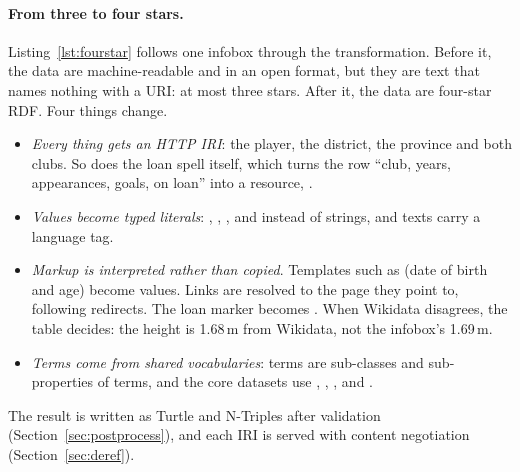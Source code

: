 \paragraph{From three to four stars.} Listing~\ref{lst:fourstar} follows one
infobox through the transformation. Before it, the data are machine-readable
and in an open format, but they are text that names nothing with a URI: at
most three stars. After it, the data are four-star RDF. Four things change.
\begin{itemize}
  \item \emph{Every thing gets an HTTP IRI}: the player, the district, the
        province and both clubs. So does the loan spell itself, which turns
        the row ``club, years, appearances, goals, on loan'' into a resource,
        .
  \item \emph{Values become typed literals}: ,
        , ,  and
         instead of strings, and texts carry a language tag.
  \item \emph{Markup is interpreted rather than copied}. Templates such as
         (date of birth and age) become values. Links are
        resolved to the page they point to, following redirects. The loan
        marker  becomes . When
        Wikidata disagrees, the  table decides: the height is
        1.68\,m from Wikidata, not the infobox's 1.69\,m.
  \item \emph{Terms come from shared vocabularies}:  terms are
        sub-classes and sub-properties of  terms, and the core
        datasets use , , ,  and
        .
\end{itemize}
The result is written as Turtle and N-Triples after validation
(Section~\ref{sec:postprocess}), and each IRI is served with content
negotiation (Section~\ref{sec:deref}).

